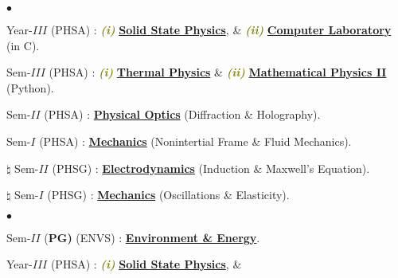 \documentclass[margin,line]{res}
\newenvironment{list1}{
  \begin{list}{\ding{113}}{%
      \setlength{\itemsep}{0in}
      \setlength{\parsep}{0in} \setlength{\parskip}{0in}
      \setlength{\topsep}{0in} \setlength{\partopsep}{0in} 
      \setlength{\leftmargin}{0.17in}}}{\end{list}}
\newenvironment{list2}{
  \begin{list}{$\bullet$}{%
      \setlength{\itemsep}{0in}
      \setlength{\parsep}{0in} \setlength{\parskip}{0in}
      \setlength{\topsep}{0in} \setlength{\partopsep}{0in} 
      \setlength{\leftmargin}{0.2in}}}{\end{list}}
\begin{document}
\begin{resume}
\begin{list1}
\item[] \textcolor{iris}{}
\vspace{1mm}
\end{list1}
\begin{list2}
\item Year-$III$ (PHSA) : \textcolor{olive}{\textit{\textbf{(i)}}} 
                          \href{https://amitbny.github.io/akb.github.io/sem6H_SSP.html}{\bf Solid State Physics}, \&  
                          \textcolor{olive}{\textit{\textbf{(ii)}}} 
                          \href{https://amitbny.github.io/akb.github.io/numerlabVIIIB.html}{\bf Computer Laboratory} (in C). 
\item Sem-$III$ (PHSA) : \textcolor{olive}{\textit{\textbf{(i)}}} 
                         \href{https://amitbny.github.io/akb.github.io/sem3H_thermal.html}{\bf Thermal Physics} \& 
                         \textcolor{olive}{\textit{\textbf{(ii)}}} 
                         \href{https://amitbny.github.io/akb.github.io/sem3H_numerlab.html}{\bf Mathematical Physics II} (Python).
\item Sem-$II$ (PHSA) : \href{https://amitbny.github.io/akb.github.io/sem2H_wavesdiffr.html}{\bf Physical Optics} (Diffraction \& Holography). 
\item Sem-$I$ (PHSA) : \href{https://amitbny.github.io/akb.github.io/sem1H_fluidniner.html}{\bf Mechanics} (Nonintertial Frame \& Fluid Mechanics). 
\item[$\pmb{\natural}$] Sem-$II$ (PHSG) : \href{https://amitbny.github.io/akb.github.io/sem2G_indmax.html}{\bf Electrodynamics} (Induction \& Maxwell's Equation). 
\item[$\pmb{\natural}$] Sem-$I$ (PHSG) : \href{https://amitbny.github.io/akb.github.io/sem1G_osc.html}{\bf Mechanics} (Oscillations \& Elasticity). 
\end{list2}
\begin{list1}
\item[] \textcolor{iris}{}
\vspace{1mm}
\end{list1}
\begin{list2}
\item Sem-$II$ (\textcolor{lavendermagenta}{\sf \bf PG)} (ENVS) : \href{https://amitbny.github.io/akb.github.io/enerenv.html}{\bf Environment \& Energy}.
\item Year-$III$ (PHSA) : \textcolor{olive}{\textit{\textbf{(i)}}} 
                          \href{https://amitbny.github.io/akb.github.io/sem6H_SSP.html}{\bf Solid State Physics}, \&  

\end{list2}
\end{resume}
\end{document}
